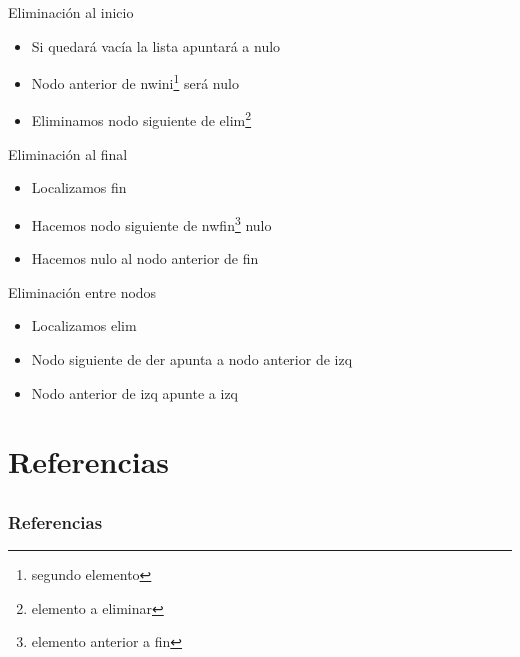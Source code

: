 \documentclass{beamer}
\begin{document}
\begin{frame}{Eliminaci\'on al inicio}
	\begin{itemize}
		\item Si quedar\'a vac\'ia la lista apuntar\'a a nulo
		\item Nodo anterior de nwini\footnote{segundo elemento} ser\'a nulo 
		\item Eliminamos nodo siguiente de elim\footnote{elemento a eliminar}
	\end{itemize}
\end{frame}

\begin{frame}{Eliminaci\'on al final}
	\begin{itemize}
		\item Localizamos fin
		\item Hacemos nodo siguiente de nwfin\footnote{elemento anterior a fin} nulo
		\item Hacemos nulo al nodo anterior de fin
	\end{itemize}
\end{frame}

\begin{frame}{Eliminaci\'on entre nodos}
	\begin{itemize}
		\item Localizamos elim
		\item Nodo siguiente de der apunta a nodo anterior de izq
		\item Nodo anterior de izq apunte a izq\nocite{BHASIN,BJARNE1,BJARNE2,CAIRO,CPP,DEITEL,DOWNEY,JAWORSKI,KENN,lAAKMANN,MATTHES,RAMALHO,SED,BRASSARD}
	\end{itemize}
\end{frame}

\section{Referencias}
\subsection{}
\begin{frame}[allowframebreaks]
	\frametitle{Referencias}
	
	
\end{frame}
\end{document}
